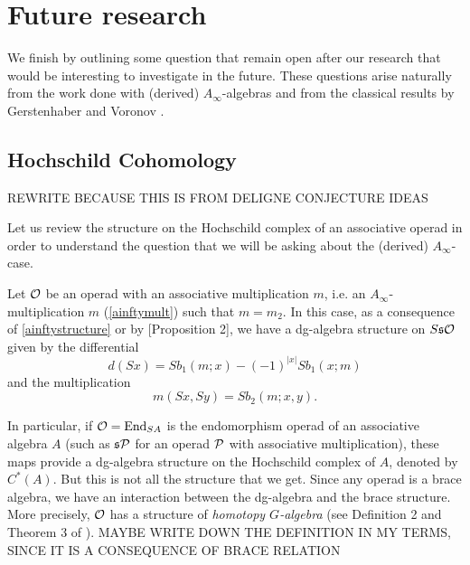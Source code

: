 \documentclass[Thesis.tex]{subfiles}
\begin{document}

\chapter{Future research}\label{future}

We finish by outlining some question that remain open after our research that would be interesting to investigate in the future. These questions arise naturally from the work done with (derived) $A_\infty$-algebras and from the classical results by Gerstenhaber and Voronov \cite{GV}.



\section{Hochschild Cohomology}

REWRITE BECAUSE THIS IS FROM DELIGNE CONJECTURE IDEAS

Let us review the structure on the Hochschild complex of an associative operad in order to understand the question that we will be asking about the (derived) $A_\infty$-case.

Let ${\mathcal O}$ be an operad with an associative multiplication $m$, i.e. an $A_\infty$-multiplication $m$ (\cref{ainftymult}) such that $m=m_2$. In this case, as a consequence of \cref{ainftystructure} or by \cite{GV}[Proposition 2], we have a dg-algebra structure on $S\mathfrak{s}{\mathcal O}$ given by the differential
\[d(Sx) =  Sb_1(m; x) -(-1)^{|x|}Sb_1(x; m)\]
and the multiplication
\[m(Sx,Sy) = Sb_2(m;x,y).\]

In particular, if ${\mathcal O} = \operatorname{End}_{SA}$ is the endomorphism operad of an associative algebra $A$ (such as $\mathfrak{s}\mathcal{P}$ for an operad $\mathcal{P}$ with associative multiplication), these maps provide a dg-algebra structure on the Hochschild complex of $A$, denoted by $C^*(A)$. But this is not all the structure that we get. Since any operad is a brace algebra, we have an interaction between the dg-algebra and the brace structure. More precisely, ${\mathcal O}$ has a structure of \emph{homotopy $G$-algebra} (see Definition 2 and Theorem 3 of \cite{GV}). MAYBE WRITE DOWN THE DEFINITION IN MY TERMS, SINCE IT IS A CONSEQUENCE OF BRACE RELATION
\end{document}
